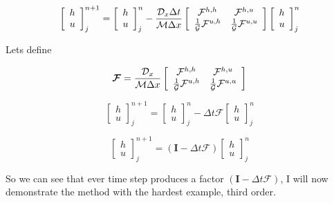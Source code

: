 \documentclass[12pt]{article}
\begin{document}
\[\left[\begin{array}{c}
h \\ u
\end{array}\right]^{n+1}_j = \left[\begin{array}{c}
h \\ u
\end{array}\right]^{n}_j - \frac{\mathcal{D}_x\Delta t}{\mathcal{M}\Delta x}\left[\begin{array}{c c}
\mathcal{F}^{h,h} & \mathcal{F}^{h,u} \\ \frac{1}{\mathcal{G}}\mathcal{F}^{u,h} &  \frac{1}{\mathcal{G}}\mathcal{F}^{u,u} 
\end{array}\right]\left[\begin{array}{c}
h \\ u
\end{array}\right]^{n}_j  \]

Lets define

\[\boldsymbol{\mathcal{F}} = \frac{\mathcal{D}_x}{\mathcal{M}\Delta x}\left[\begin{array}{c c}
\mathcal{F}^{h,h} & \mathcal{F}^{h,u} \\ \frac{1}{\mathcal{G}}\mathcal{F}^{u,h} &  \frac{1}{\mathcal{G}}\mathcal{F}^{u,u} 
\end{array}\right] \]

\[\left[\begin{array}{c}
h \\ u
\end{array}\right]^{n+1}_j = \left[\begin{array}{c}
h \\ u
\end{array}\right]^{n}_j - \Delta t\boldsymbol{\mathcal{F}}\left[\begin{array}{c}
h \\ u
\end{array}\right]^{n}_j  \]

\[\left[\begin{array}{c}
h \\ u
\end{array}\right]^{n+1}_j = \left(\boldsymbol{I} - \Delta t\boldsymbol{\mathcal{F}} \right)\left[\begin{array}{c}
h \\ u
\end{array}\right]^{n}_j  \]

So we can see that ever time step produces a factor $\left(\boldsymbol{I} - \Delta t\boldsymbol{\mathcal{F}} \right)$, I will now demonstrate the method with the hardest example, third order.
\end{document}
